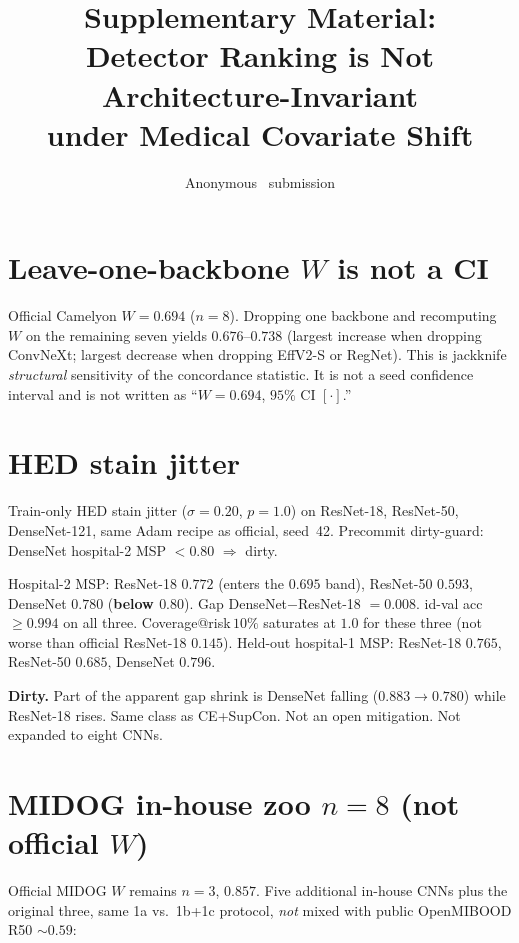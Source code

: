 \documentclass[10pt,twocolumn,letterpaper]{article}
\title{Supplementary Material:\\Detector Ranking is Not Architecture-Invariant\\under Medical Covariate Shift}
\author{Anonymous \confName~submission}
\begin{document}
\maketitle

\section{Leave-one-backbone $W$ is not a CI}

Official Camelyon $W{=}0.694$ ($n{=}8$).
Dropping one backbone and recomputing $W$ on the remaining seven yields $0.676$--$0.738$ (largest increase when dropping ConvNeXt; largest decrease when dropping EffV2-S or RegNet).
This is jackknife \emph{structural} sensitivity of the concordance statistic.
It is not a seed confidence interval and is not written as ``$W{=}0.694$, $95\%$ CI $[\cdot]$.''

\section{HED stain jitter}

Train-only HED stain jitter ($\sigma{=}0.20$, $p{=}1.0$) on ResNet-18, ResNet-50, DenseNet-121, same Adam recipe as official, seed~42.
Precommit dirty-guard: DenseNet hospital-2 MSP ${<}0.80$ ${\Rightarrow}$ dirty.

Hospital-2 MSP: ResNet-18 $0.772$ (enters the $0.695$ band), ResNet-50 $0.593$, DenseNet $0.780$ (\textbf{below $0.80$}).
Gap DenseNet${-}$ResNet-18 ${=}0.008$.
id-val acc ${\ge}0.994$ on all three.
Coverage@risk\,$10\%$ saturates at $1.0$ for these three (not worse than official ResNet-18 $0.145$).
Held-out hospital-1 MSP: ResNet-18 $0.765$, ResNet-50 $0.685$, DenseNet $0.796$.

\textbf{Dirty.}
Part of the apparent gap shrink is DenseNet falling ($0.883{\to}0.780$) while ResNet-18 rises.
Same class as CE{+}SupCon.
Not an open mitigation.
Not expanded to eight CNNs.

\section{MIDOG in-house zoo $n{=}8$ (not official $W$)}

Official MIDOG $W$ remains $n{=}3$, $0.857$.
Five additional in-house CNNs plus the original three, same 1a vs.\ 1b{+}1c protocol, \emph{not} mixed with public OpenMIBOOD R50 ${\sim}0.59$:
\end{document}

